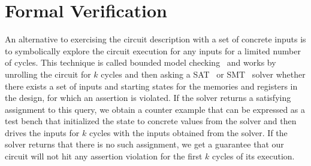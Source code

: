 \documentclass[conference]{IEEEtran}
\begin{document}
\section{Formal Verification}


An alternative to exercising the circuit description with a set of concrete inputs is to symbolically explore the circuit execution
for any inputs for a limited number of cycles.
This technique is called bounded model checking~\cite{bmc} and works by unrolling the circuit for $k$ cycles and then asking a
SAT~\cite{sat} or SMT~\cite{smt} solver whether there exists a set of inputs and starting states for the memories and registers in the
design, for which an assertion is violated.
If the solver returns a satisfying assignment to this query, we obtain a counter example that can be expressed as a test bench that
initialized the state to concrete values from the solver and then drives the inputs for $k$ cycles with the inputs obtained from the solver.
If the solver returns that there is no such assignment, we get a guarantee that our circuit will not hit any assertion violation for the first $k$
cycles of its execution.
\end{document}
